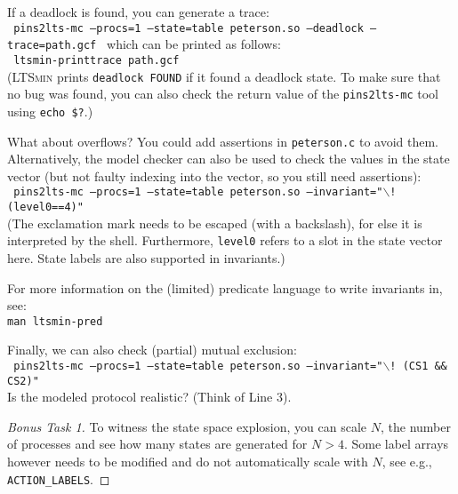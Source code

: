 \documentclass[12pt]{article}
\def\ltsmin{\textsc{LTSmin}\xspace}
\begin{document}
If a deadlock is found, you can generate a trace:\\
{\footnotesize
\texttt{
pins2lts-mc --procs=1 --state=table peterson.so
--deadlock --trace=path.gcf 
}}
which can be printed as follows:\\
{\footnotesize
\texttt{
ltsmin-printtrace path.gcf 
}}\\
(\ltsmin prints \texttt{deadlock FOUND} if it found a deadlock state. To make sure that no bug was found, you can also check the return value of the \texttt{pins2lts-mc} tool using \texttt{echo \$?}.)


What about overflows? You could add assertions in 
\texttt{peterson.c} to avoid them. Alternatively, the model checker
can also be used to check the values in the state vector (but not faulty indexing into the vector, so you still need assertions):\\
{\footnotesize
\texttt{
pins2lts-mc --procs=1 --state=table peterson.so
--invariant="$\backslash$! (level0==4)"
}}\\
(The exclamation mark needs to be escaped (with a backslash),
for else it is interpreted by the shell. 
Furthermore, \texttt{level0} refers to a slot in the state vector here.
State labels are also supported in invariants.)

For more information on the (limited) predicate language to write invariants in, see:\\
{\footnotesize\texttt{man ltsmin-pred}}

Finally, we can also check (partial) mutual exclusion:\\
{\footnotesize
\texttt{
pins2lts-mc --procs=1 --state=table peterson.so
--invariant="$\backslash$! (CS1 \&\& CS2)"
}}\\



Is the modeled protocol realistic? (Think of Line 3).


\begin{proof}[Bonus Task 1]
To witness the state space explosion, you can scale $N$,
the number of processes and see how many states are generated for
$N> 4$.
Some label arrays however needs to be modified and do not
automatically scale with $N$, see e.g., \texttt{ACTION\_LABELS}.
\end{proof}
\end{document}
